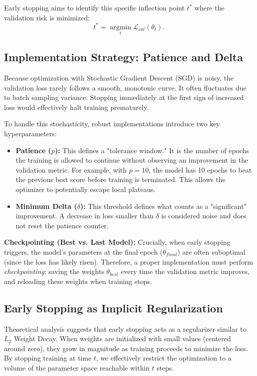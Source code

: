 \documentclass[12pt,a4paper]{report}
\begin{document}
Early stopping aims to identify this specific inflection point $t^*$ where the validation risk is minimized:
$$ t^* = \operatorname*{argmin}_t \mathcal{L}_{val}(\theta_t). $$

\subsection{Implementation Strategy: Patience and Delta}
Because optimization with Stochastic Gradient Descent (SGD) is noisy, the validation loss rarely follows a smooth, monotonic curve. It often fluctuates due to batch sampling variance. Stopping immediately at the first sign of increased loss would effectively halt training prematurely.

To handle this stochasticity, robust implementations introduce two key hyperparameters:
\begin{itemize}
    \item \textbf{Patience ($p$):} This defines a "tolerance window." It is the number of epochs the training is allowed to continue without observing an improvement in the validation metric. For example, with $p=10$, the model has 10 epochs to beat the previous best score before training is terminated. This allows the optimizer to potentially escape local plateaus.
    \item \textbf{Minimum Delta ($\delta$):} This threshold defines what counts as a "significant" improvement. A decrease in loss smaller than $\delta$ is considered noise and does not reset the patience counter.
\end{itemize}

\textbf{Checkpointing (Best vs. Last Model):}
Crucially, when early stopping triggers, the model's parameters at the final epoch ($\theta_{final}$) are often suboptimal (since the loss has likely risen). Therefore, a proper implementation must perform \textit{checkpointing}: saving the weights $\theta_{best}$ every time the validation metric improves, and reloading these weights when training stops.

\subsection{Early Stopping as Implicit Regularization}
Theoretical analysis suggests that early stopping acts as a regularizer similar to $L_2$ Weight Decay.
When weights are initialized with small values (centered around zero), they grow in magnitude as training proceeds to minimize the loss. By stopping training at time $t$, we effectively restrict the optimization to a volume of the parameter space reachable within $t$ steps.
\end{document}

